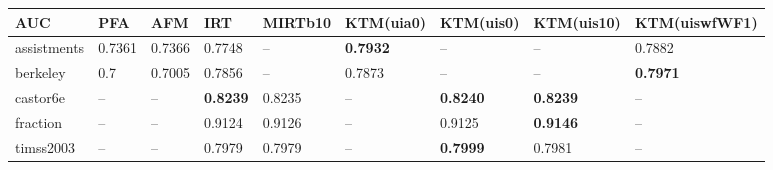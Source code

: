 \begin{tabular}{lllllllll}
\toprule
AUC &     PFA &     AFM &              IRT &          MIRTb10 &        KTM(uia0) &        KTM(uis0) &       KTM(uis10) &    KTM(uiswfWF1) \\
\midrule
assistments &  0.7361 &  0.7366 &           0.7748 &               -- &  \textbf{0.7932} &               -- &               -- &           0.7882 \\
berkeley    &     0.7 &  0.7005 &           0.7856 &               -- &           0.7873 &               -- &               -- &  \textbf{0.7971} \\
castor6e    &      -- &      -- &  \textbf{0.8239} &           0.8235 &               -- &  \textbf{0.8240} &  \textbf{0.8239} &               -- \\
fraction    &      -- &      -- &           0.9124 &           0.9126 &               -- &           0.9125 &  \textbf{0.9146} &               -- \\
timss2003   &      -- &      -- &           0.7979 &           0.7979 &               -- &  \textbf{0.7999} &           0.7981 &               -- \\
\bottomrule
\end{tabular}
